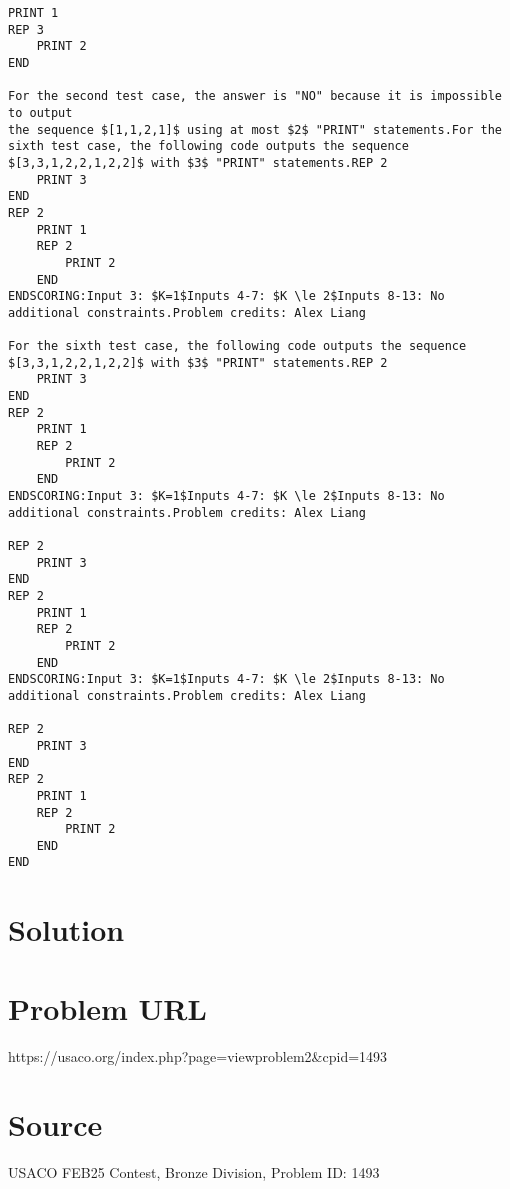 \documentclass[12pt]{article}
\begin{document}
\begin{verbatim}
PRINT 1
REP 3
    PRINT 2
END

For the second test case, the answer is "NO" because it is impossible to output
the sequence $[1,1,2,1]$ using at most $2$ "PRINT" statements.For the sixth test case, the following code outputs the sequence
$[3,3,1,2,2,1,2,2]$ with $3$ "PRINT" statements.REP 2
    PRINT 3
END
REP 2
    PRINT 1
    REP 2
        PRINT 2
    END
ENDSCORING:Input 3: $K=1$Inputs 4-7: $K \le 2$Inputs 8-13: No
additional constraints.Problem credits: Alex Liang

For the sixth test case, the following code outputs the sequence
$[3,3,1,2,2,1,2,2]$ with $3$ "PRINT" statements.REP 2
    PRINT 3
END
REP 2
    PRINT 1
    REP 2
        PRINT 2
    END
ENDSCORING:Input 3: $K=1$Inputs 4-7: $K \le 2$Inputs 8-13: No
additional constraints.Problem credits: Alex Liang

REP 2
    PRINT 3
END
REP 2
    PRINT 1
    REP 2
        PRINT 2
    END
ENDSCORING:Input 3: $K=1$Inputs 4-7: $K \le 2$Inputs 8-13: No
additional constraints.Problem credits: Alex Liang

REP 2
    PRINT 3
END
REP 2
    PRINT 1
    REP 2
        PRINT 2
    END
END
\end{verbatim}

\section*{Solution}


\section*{Problem URL}
https://usaco.org/index.php?page=viewproblem2&cpid=1493

\section*{Source}
USACO FEB25 Contest, Bronze Division, Problem ID: 1493
\end{document}

